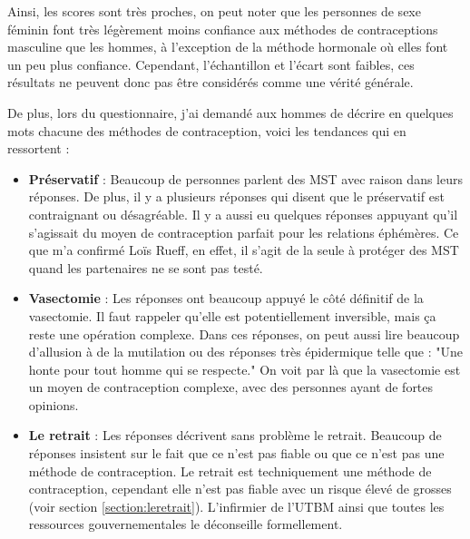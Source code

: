 \documentclass[12pt,a4paper]{report}
\begin{document}
Ainsi, les scores sont très proches, on peut noter que les personnes de sexe féminin font très légèrement moins confiance aux méthodes de contraceptions masculine que les hommes, à l'exception de la méthode hormonale où elles font un peu plus confiance. Cependant, l'échantillon et l'écart sont faibles, ces résultats ne peuvent donc pas être considérés comme une vérité générale.

De plus, lors du questionnaire, j'ai demandé aux hommes de décrire en quelques mots chacune des méthodes de contraception, voici les tendances qui en ressortent :

\begin{itemize}
    \item \textbf{Préservatif} : Beaucoup de personnes parlent des MST avec raison dans leurs réponses. De plus, il y a plusieurs réponses qui disent que le préservatif est contraignant ou désagréable. Il y a aussi eu quelques réponses appuyant qu'il s'agissait du moyen de contraception parfait pour les relations éphémères. Ce que m'a confirmé Loïs Rueff, en effet, il s'agit de la seule à protéger des MST quand les partenaires ne se sont pas testé.
    
    \item \textbf{Vasectomie} : Les réponses ont beaucoup appuyé le côté définitif de la vasectomie. Il faut rappeler qu'elle est potentiellement inversible, mais ça reste une opération complexe. Dans ces réponses, on peut aussi lire beaucoup d'allusion à de la mutilation ou des réponses très épidermique telle que : "Une honte pour tout homme qui se respecte."
    On voit par là que la vasectomie est un moyen de contraception complexe, avec des personnes ayant de fortes opinions.
    
    \item \textbf{Le retrait} : Les réponses décrivent sans problème le retrait. Beaucoup de réponses insistent sur le fait que ce n'est pas fiable ou que ce n'est pas une méthode de contraception. Le retrait est techniquement une méthode de contraception, cependant elle n'est pas fiable avec un risque élevé de grosses (voir section \ref{section:leretrait}). L'infirmier de l'UTBM ainsi que toutes les ressources gouvernementales le déconseille formellement.


\end{itemize}
\end{document}
